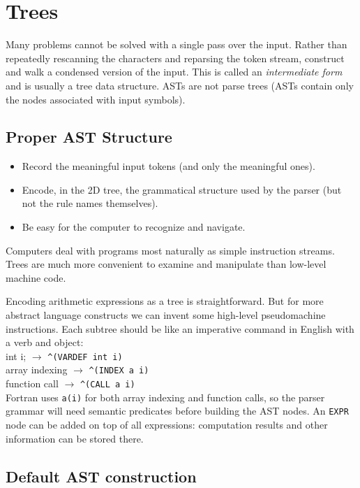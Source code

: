 \section{Trees}

Many problems cannot be solved with a single pass over the input.
Rather than repeatedly rescanning the characters
and reparsing the token stream,
construct and walk a condensed version of the input.
This is called an \emph{intermediate form}
and is usually a tree data structure.
ASTs are not parse trees
(ASTs contain only the nodes associated with input symbols).


\subsection{Proper AST Structure}

\begin{itemize}
\item
Record the meaningful input tokens (and only the meaningful ones).

\item
Encode, in the 2D tree, the grammatical structure used by the parser
(but not the rule names themselves).

\item
Be easy for the computer to recognize and navigate.
\end{itemize}

Computers deal with programs most naturally as simple instruction streams.
Trees are much more convenient to examine and manipulate
than low-level machine code.

Encoding arithmetic expressions as a tree is straightforward.
But for more abstract language constructs
we can invent some high-level pseudomachine instructions.
Each subtree should be like an imperative command in English
with a verb and object:\\
int i; $\rightarrow$ \verb|^(VARDEF int i)|\\
array indexing $\rightarrow$ \verb=^(INDEX a i)=\\
function call $\rightarrow$ \verb=^(CALL a i)=\\
Fortran uses \verb=a(i)= for both array indexing and function calls,
so the parser grammar will need semantic predicates
before building the AST nodes.
An \verb=EXPR= node can be added on top of all expressions:
computation results and other information can be stored there.


\subsection{Default AST construction}

